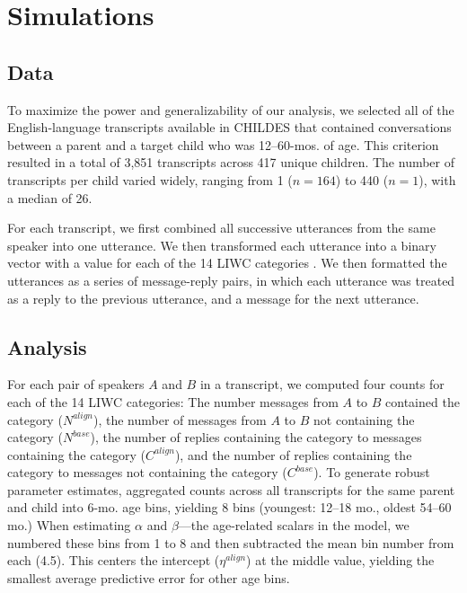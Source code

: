 \documentclass[10pt,letterpaper]{article}
\begin{document}
\section{Simulations}

\subsection{Data}

To maximize the power and generalizability of our analysis, we selected all of the English-language transcripts available in CHILDES \cite{macwhinney2000} that contained conversations between a parent and a target child who was 12--60-mos. of age. This criterion resulted in a total of 3,851 transcripts across 417 unique children. The number of transcripts per child varied widely, ranging from 1 ($n = 164$) to 440 ($n = 1$), with a median of 26.

For each transcript, we first combined all successive utterances from the same speaker into one utterance. We then transformed each utterance into a binary vector with a value for each of the 14 LIWC categories \cite{pennebaker2007}. We then formatted the utterances as a series of message-reply pairs, in which each utterance was treated as a reply to the previous utterance, and a message for the next utterance.

\subsection{Analysis}

For each pair of speakers $A$ and $B$  in a transcript, we computed four counts for each of the 14 LIWC categories: The number messages from $A$ to $B$ contained the category ($N^{align}$), the number of messages from $A$ to $B$ not containing the category ($N^{base}$), the number of replies containing the category to messages containing the category ($C^{align}$), and the number of replies containing the category to messages not containing the category ($C^{base}$). To generate robust parameter estimates, aggregated counts across all transcripts for the same parent and child into 6-mo. age bins, yielding 8 bins (youngest: 12--18 mo., oldest 54--60 mo.) When estimating $\alpha$ and $\beta$---the age-related scalars in the model, we numbered these bins from 1 to 8 and then subtracted the mean bin number from each (4.5). This centers the intercept ($\eta^{align}$) at the middle value, yielding the smallest average predictive error for other age bins.
\end{document}

